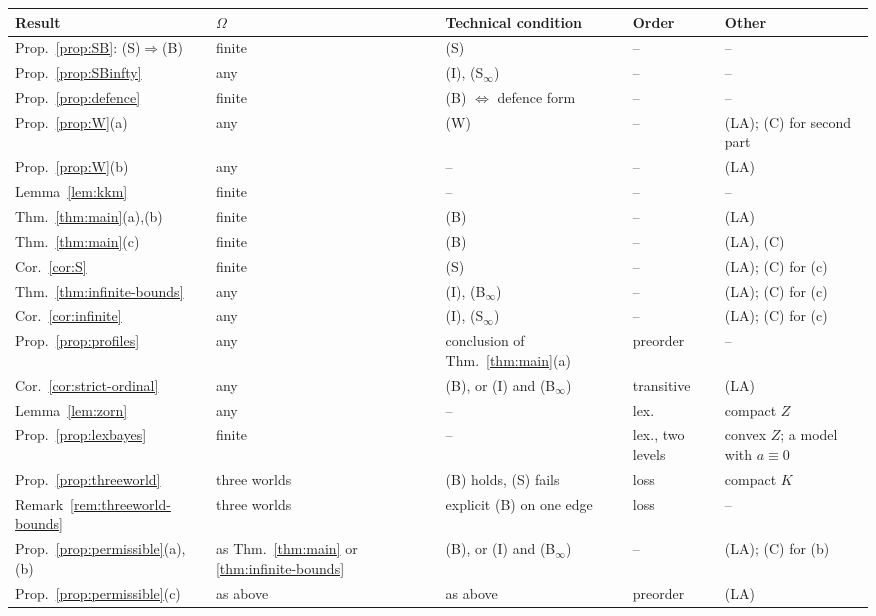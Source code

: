 \documentclass[11pt]{article}
\theoremstyle{definition}
\theoremstyle{remark}
\begin{document}
\begingroup\small
\begin{longtable}{>{\raggedright\arraybackslash}p{}>{\raggedright\arraybackslash}p{}>{\raggedright\arraybackslash}p{}>{\raggedright\arraybackslash}p{}>{\raggedright\arraybackslash}p{}}
\toprule
Result & $\Omega$ & Technical condition & Order & Other\\
\midrule\endhead
\bottomrule\endfoot
Prop.~\ref{prop:SB}: (S)$\Rightarrow$(B) & finite & (S) & -- & --\\
Prop.~\ref{prop:SBinfty} & any & (I), (S$_\infty$) & -- & --\\
Prop.~\ref{prop:defence} & finite & (B) $\Leftrightarrow$ defence form & -- & --\\
Prop.~\ref{prop:W}(a) & any & (W) & -- & (LA); (C) for second part\\
Prop.~\ref{prop:W}(b) & any & -- & -- & (LA)\\
Lemma~\ref{lem:kkm} & finite & -- & -- & --\\
Thm.~\ref{thm:main}(a),(b) & finite & (B) & -- & (LA)\\
Thm.~\ref{thm:main}(c) & finite & (B) & -- & (LA), (C)\\
Cor.~\ref{cor:S} & finite & (S) & -- & (LA); (C) for (c)\\
Thm.~\ref{thm:infinite-bounds} & any & (I), (B$_\infty$) & -- & (LA); (C) for (c)\\
Cor.~\ref{cor:infinite} & any & (I), (S$_\infty$) & -- & (LA); (C) for (c)\\
Prop.~\ref{prop:profiles} & any & conclusion of Thm.~\ref{thm:main}(a) & preorder & --\\
Cor.~\ref{cor:strict-ordinal} & any & (B), or (I) and (B$_\infty$) & transitive & (LA)\\
Lemma~\ref{lem:zorn} & any & -- & lex. & compact $Z$\\
Prop.~\ref{prop:lexbayes} & finite & -- & lex., two levels & convex $Z$; a model with $a\equiv0$\\
Prop.~\ref{prop:threeworld} & three worlds & (B) holds, (S) fails & loss & compact $K$\\
Remark~\ref{rem:threeworld-bounds} & three worlds & explicit (B) on one edge & loss & --\\
Prop.~\ref{prop:permissible}(a),(b) & as Thm.~\ref{thm:main} or \ref{thm:infinite-bounds} & (B), or (I) and (B$_\infty$) & -- & (LA); (C) for (b)\\
Prop.~\ref{prop:permissible}(c) & as above & as above & preorder & (LA)\\

\end{longtable}
\end{document}
